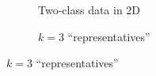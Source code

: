 \begin{frame}

\begin{figure}[ht]
     \centering
     \begin{subfigure}[t]{0.37\textwidth}
         \centering
         \usebox{\imagebox}%
         \caption{Two-class data in 2D}
         \label{fig:quadratic}
     \end{subfigure}
     \hspace{2mm}
     \begin{subfigure}[t]{0.37\textwidth}
         \centering
         \caption{$k=3$ ``representatives''}
         \label{fig:rbf-network}
     \end{subfigure}
\end{figure}

\end{frame}

